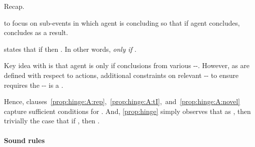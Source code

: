 \begin{note}
  Recap.

  \se{} to focus on sub-events in which agent is concluding so that if agent concludes, concludes as a result.

  \requ{} states that if \se{} then \fc{}.
  In other words, \se{} \emph{only if} \fc{}.

  Key idea with \tC{} is that agent is \tC{} only if conclusions from various --.
  However, as  are defined with respect to actions, additional constraints on relevant -- to ensure \tC{} requires the -- is a \fc{}.

  Hence, clauses~\ref{prop:hinge:A:rep},~\ref{prop:hinge:A:tI},~and~\ref{prop:hinge:A:novel} capture sufficient conditions for \fc{}.
  And, \autoref{prop:hinge} simply observes that as \fc{}, then trivially the case that if \se{}, then \requ{}.
\end{note}


\paragraph*{Sound rules}

\begin{note}
  \color{red}
\end{note}

